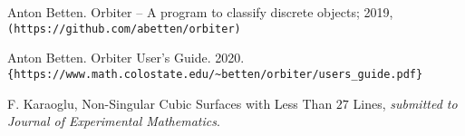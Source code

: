 \documentclass{article}
\begin{document}
\begin{thebibliography}{99}

 Anton Betten. Orbiter -- A program to classify discrete objects; 2019,
\verb+(https://github.com/abetten/orbiter)+

 Anton Betten. Orbiter User's Guide. 2020. \verb+{https://www.math.colostate.edu/~betten/orbiter/users_guide.pdf}+

F. Karaoglu, Non-Singular Cubic Surfaces with Less Than $27$ Lines, \emph{submitted to Journal of Experimental Mathematics}.
\end{thebibliography}
\end{document}
